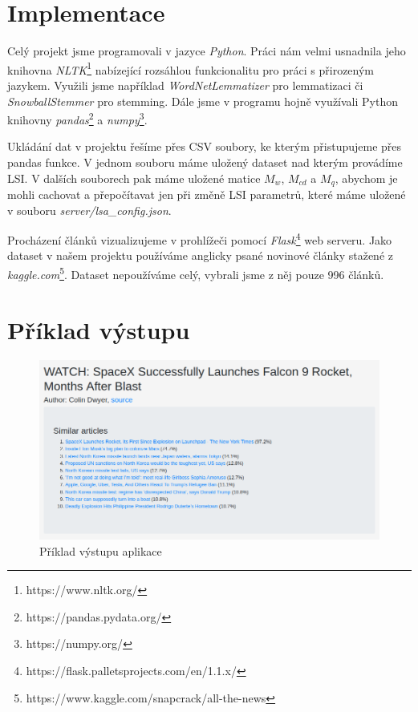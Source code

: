 \documentclass[11pt]{scrartcl} %
\begin{document}
\section{Implementace}

Celý projekt jsme programovali v jazyce \emph{Python}. Práci nám velmi usnadnila jeho knihovna \emph{NLTK}\footnote{https://www.nltk.org/} nabízející rozsáhlou funkcionalitu pro práci s přirozeným jazykem. Využili jsme například \emph{WordNetLemmatizer} pro lemmatizaci či \emph{SnowballStemmer} pro stemming. Dále jsme v programu hojně využívali Python knihovny \emph{pandas}\footnote{https://pandas.pydata.org/} a \emph{numpy}\footnote{https://numpy.org/}.

\bigskip

Ukládání dat v projektu řešíme přes CSV soubory, ke kterým přistupujeme přes pandas funkce. V jednom souboru máme uložený dataset nad kterým provádíme LSI. V dalších souborech pak máme uložené matice $M_w$, $M_{cd}$ a $M_q$, abychom je mohli cachovat a přepočítavat jen při změně LSI parametrů, které máme uložené v souboru \emph{server/lsa\_config.json}.

\bigskip

Procházení článků vizualizujeme v prohlížeči pomocí \emph{Flask}\footnote{https://flask.palletsprojects.com/en/1.1.x/} web serveru. Jako dataset v našem projektu používáme anglicky psané novinové články stažené z \emph{kaggle.com}\footnote{https://www.kaggle.com/snapcrack/all-the-news}. Dataset nepoužíváme celý, vybrali jsme z něj pouze 996 článků.

\section{Příklad výstupu}

\begin{figure}[h] %
	\centering
	\includegraphics[width=0.8\columnwidth]{images/output.png}
	\caption{Příklad výstupu aplikace}
	\label{output}
\end{figure}
\end{document}
